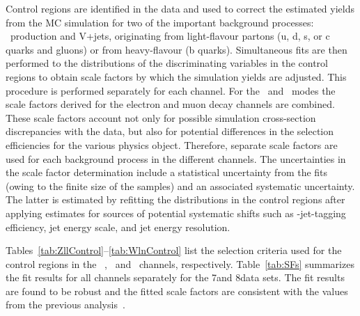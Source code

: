 \documentclass[12pt,twoside,a4paper,cmspaper,final,collab]{cms-tdr}
\begin{document}
Control regions are identified in the data and used to correct
the estimated yields from the MC simulation
for two of the important background processes:  \ttbar\ production and
V+jets, originating from light-flavour partons (u, d, s, or c
quarks and gluons) or from heavy-flavour (b quarks).
Simultaneous fits are then performed to the distributions of the discriminating
variables in the control regions to obtain scale factors by which the simulation
yields are adjusted. This procedure is performed separately for
each channel. For the \ZllH\ and \WH\ modes the scale factors
derived for the electron and muon decay channels are combined.
These scale factors  account not only for possible simulation cross-section discrepancies
with the data, but also for potential
differences in the selection efficiencies for the various physics object.
Therefore, separate scale factors are used for each background
process in the different channels. The uncertainties in the scale factor determination include
a statistical uncertainty from the fits (owing to the finite size of the samples)
 and an associated systematic uncertainty. The latter is estimated by refitting the
 distributions in the control regions after applying estimates
for sources of potential systematic shifts
such as \cPqb-jet-tagging efficiency, jet energy scale, and jet energy resolution.

Tables~\ref{tab:ZllControl}--\ref{tab:WlnControl} list the selection criteria
used for the control regions in the \ZllH\ , \ZnnH\, and \WH\ channels,
respectively. Table~\ref{tab:SFs} summarizes the fit results
for all channels separately for the 7\TeV and 8\TeV data sets.  The fit results are
found to be robust and the fitted scale factors are consistent with the values
from the previous analysis~\cite{VHbb_PLB}.
\end{document}
